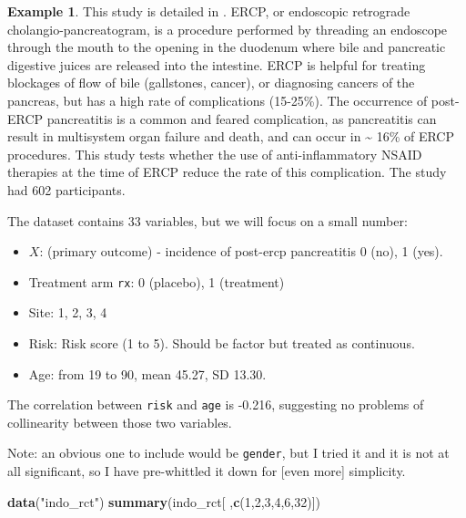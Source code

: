 \documentclass[
  openany]{book}
\newenvironment{Shaded}{\begin{snugshade}}{\end{snugshade}}
\newcommand{\DecValTok}[1]{\textcolor[rgb]{0.00,0.00,0.81}{#1}}
\newcommand{\FunctionTok}[1]{\textcolor[rgb]{0.13,0.29,0.53}{\textbf{#1}}}
\newcommand{\NormalTok}[1]{#1}
\newcommand{\StringTok}[1]{\textcolor[rgb]{0.31,0.60,0.02}{#1}}
\providecommand{\tightlist}{%
  \setlength{\itemsep}{0pt}\setlength{\parskip}{0pt}}
\theoremstyle{definition}
\theoremstyle{definition}
\newtheorem{example}{Example}[chapter]
\theoremstyle{definition}
\theoremstyle{definition}
\theoremstyle{remark}
\begin{document}
\begin{example}
\protect\hypertarget{exm:logregeg1}{}\label{exm:logregeg1}This study is detailed in \citet{elmunzer2012randomized}. ERCP, or endoscopic retrograde cholangio-pancreatogram, is a procedure performed by threading an endoscope through the mouth to the opening in the duodenum where bile and pancreatic digestive juices are released into the intestine. ERCP is helpful for treating blockages of flow of bile (gallstones, cancer), or diagnosing cancers of the pancreas, but has a high rate of complications (15-25\%). The occurrence of post-ERCP pancreatitis is a common and feared complication, as pancreatitis can result in multisystem organ failure and death, and can occur in \textasciitilde{} 16\% of ERCP procedures. This study tests whether the use of anti-inflammatory NSAID therapies at the time of ERCP reduce the rate of this complication. The study had 602 participants.

The dataset contains 33 variables, but we will focus on a small number:

\begin{itemize}
\tightlist
\item
  \(X\): (primary outcome) - incidence of post-ercp pancreatitis 0 (no), 1 (yes).
\item
  Treatment arm \texttt{rx}: 0 (placebo), 1 (treatment)
\item
  Site: 1, 2, 3, 4
\item
  Risk: Risk score (1 to 5). Should be factor but treated as continuous.
\item
  Age: from 19 to 90, mean 45.27, SD 13.30.
\end{itemize}

The correlation between \texttt{risk} and \texttt{age} is -0.216, suggesting no problems of collinearity between those two variables.

Note: an obvious one to include would be \texttt{gender}, but I tried it and it is not at all significant, so I have pre-whittled it down for {[}even more{]} simplicity.

\begin{Shaded}
\begin{Highlighting}[]
\FunctionTok{data}\NormalTok{(}\StringTok{"indo\_rct"}\NormalTok{)}
\FunctionTok{summary}\NormalTok{(indo\_rct[ ,}\FunctionTok{c}\NormalTok{(}\DecValTok{1}\NormalTok{,}\DecValTok{2}\NormalTok{,}\DecValTok{3}\NormalTok{,}\DecValTok{4}\NormalTok{,}\DecValTok{6}\NormalTok{,}\DecValTok{32}\NormalTok{)])}
\end{Highlighting}
\end{Shaded}


\end{example}
\end{document}
